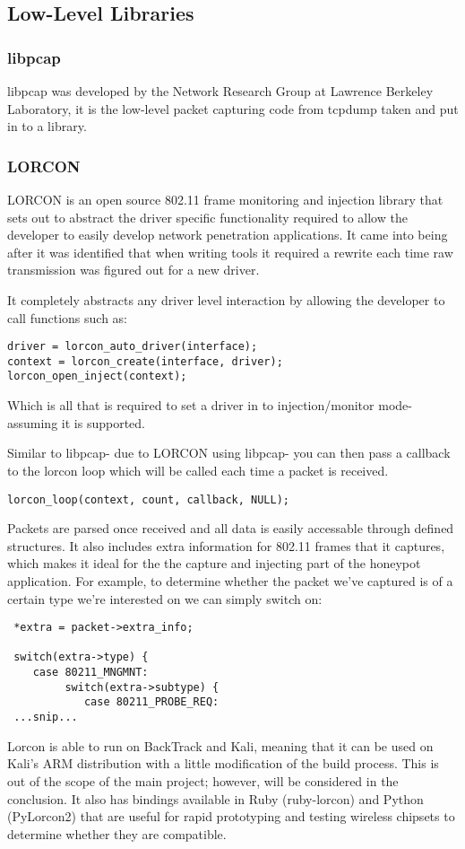 \subsection{Low-Level Libraries}
\subsubsection{libpcap}
libpcap was developed by the Network Research Group at Lawrence Berkeley Laboratory, it is the low-level packet capturing code from tcpdump taken and put in to a library.  
\subsubsection{LORCON}
LORCON is an open source 802.11 frame monitoring and injection library that sets out to abstract the driver specific functionality required to allow the developer to easily develop network penetration applications. It came into being after it was identified that when writing tools it required a rewrite each time raw transmission was figured out for a new driver.

It completely abstracts any driver level interaction by allowing the developer to call functions such as:

\begin{verbatim}
driver = lorcon_auto_driver(interface);
context = lorcon_create(interface, driver);
lorcon_open_inject(context);
\end{verbatim}

Which is all that is required to set a driver in to injection/monitor mode- assuming it is supported.

Similar to libpcap- due to LORCON using libpcap- you can then pass a callback to the lorcon loop which will be called each time a packet is received.

\begin{verbatim}
lorcon_loop(context, count, callback, NULL);
\end{verbatim}

Packets are parsed once received and all data is easily accessable through defined structures. It also includes extra information for 802.11 frames that it captures, which makes it ideal for the the capture and injecting part of the honeypot application. For example, to determine whether the packet we've captured is of a certain type we're interested on we can simply switch on:
\begin{verbatim}
 *extra = packet->extra_info;

 switch(extra->type) {
 	case 80211_MNGMNT:
 		 switch(extra->subtype) {
 		 	case 80211_PROBE_REQ:
 ...snip...
\end{verbatim}
Lorcon is able to run on BackTrack and Kali, meaning that it can be used on Kali's ARM distribution with a little modification of the build process. This is out of the scope of the main project; however, will be considered in the conclusion. It also has bindings available in Ruby (ruby-lorcon) and Python (PyLorcon2) that are useful for rapid prototyping and testing wireless chipsets to determine whether they are compatible.

